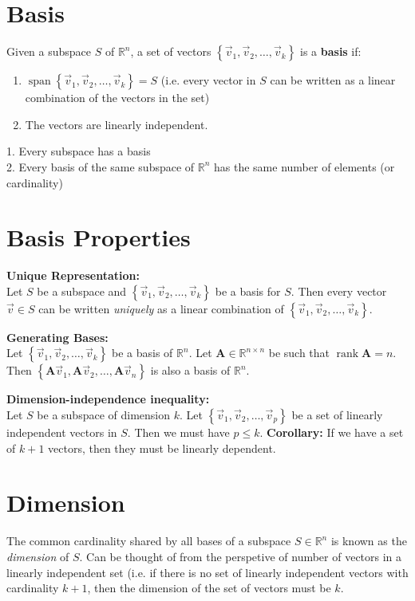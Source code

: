 \section{\small Basis}

Given a subspace $S$ of $\mathbb{R}^n$, a set of vectors $ \left\{
	\vec{v}_1, \vec{v}_2, \ldots, \vec{v}_k \right\}$ is a \textbf{basis} if:

\begin{enumerate}[label=(\roman*)]
	\item $\operatorname{span} \left\{ \vec{v}_1, \vec{v}_2, \ldots, \vec{v}_k
		      \right\} = S$ (i.e. every vector in $S$ can be written as a linear
	      combination of the vectors in the set)
	\item The vectors are linearly independent.
\end{enumerate}

1. Every subspace has a basis \\
2. Every basis of the same subspace of $\mathbb{R}^n$ has the same number of
elements (or cardinality)

\section{\small Basis Properties}

\textbf{Unique Representation:}\\
Let $S$ be a subspace and $\left\{ \vec{v}_1,
	\vec{v}_2, \ldots, \vec{v}_k \right\}$ be a basis for $S$. Then every vector
$\vec{v} \in S$ can be written \textit{uniquely} as a linear combination of
$\left\{ \vec{v}_1, \vec{v}_2, \ldots, \vec{v}_k \right\}$.

\textbf{Generating Bases:}\\
Let $\left\{ \vec{v}_1, \vec{v}_2, \ldots,
	\vec{v}_k \right\}$ be a basis of $\mathbb{R}^n$. Let $\mathbf{A} \in
	\mathbb{R}^{n \times n}$ be such that $\operatorname{rank} \mathbf{A} = n$.
Then $\left\{ \mathbf{A} \vec{v}_1, \mathbf{A} \vec{v}_2, \ldots, \mathbf{A}
	\vec{v}_n \right\}$ is also a basis of $\mathbb{R}^n$.

\textbf{Dimension-independence inequality:}\\
Let $S$ be a subspace of dimension $k$. Let $\left\{ \vec{v}_1, \vec{v}_2,
	\ldots, \vec{v}_p \right\}$ be a set of linearly independent vectors in $S$.
Then we must have $p \leq k$. \textbf{Corollary:} If we have a set of $k +
	1$ vectors, then they must be linearly dependent.

\section{\small Dimension}
The common cardinality shared by all bases of a subspace $S \in \mathbb{R}^n$ is
known as the \textit{dimension} of $S$. Can be thought of from the perspetive of
number of vectors in a linearly independent set (i.e. if there is no set of
linearly independent vectors with cardinality $k + 1$, then the dimension of the
set of vectors must be $k$.

